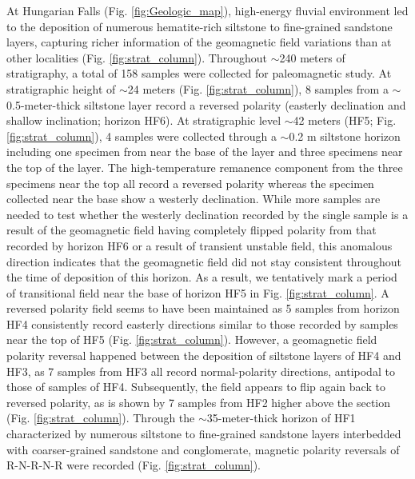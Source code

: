 \documentclass[draft]{agujournal2019}
\begin{document}
At Hungarian Falls (Fig. \ref{fig:Geologic_map}), high-energy fluvial environment led to the deposition of numerous hematite-rich siltstone to fine-grained sandstone layers, capturing richer information of the geomagnetic field variations than at other localities (Fig. \ref{fig:strat_column}). Throughout $\sim$240 meters of stratigraphy, a total of 158 samples were collected for paleomagnetic study. At stratigraphic height of $\sim$24 meters (Fig. \ref{fig:strat_column}), 8 samples from a $\sim$0.5-meter-thick siltstone layer record a reversed polarity (easterly declination and shallow inclination; horizon HF6). At stratigraphic level $\sim$42 meters (HF5; Fig. \ref{fig:strat_column}), 4 samples were collected through a $\sim$0.2 m siltstone horizon including one specimen from near the base of the layer and three specimens near the top of the layer. The high-temperature remanence component from the three specimens near the top all record a reversed polarity whereas the specimen collected near the base show a westerly declination. While more samples are needed to test whether the westerly declination recorded by the single sample is a result of the geomagnetic field having completely flipped polarity from that recorded by horizon HF6 or a result of transient unstable field, this anomalous direction indicates that the geomagnetic field did not stay consistent throughout the time of deposition of this horizon. As a result, we tentatively mark a period of transitional field near the base of horizon HF5 in Fig. \ref{fig:strat_column}. A reversed polarity field seems to have been maintained as 5 samples from horizon HF4 consistently record easterly directions similar to those recorded by samples near the top of HF5 (Fig. \ref{fig:strat_column}). However, a geomagnetic field polarity reversal happened between the deposition of siltstone layers of HF4 and HF3, as 7 samples from HF3 all record normal-polarity directions, antipodal to those of samples of HF4. Subsequently, the field appears to flip again back to reversed polarity, as is shown by 7 samples from HF2 higher above the section (Fig. \ref{fig:strat_column}). Through the $\sim$35-meter-thick horizon of HF1 characterized by numerous siltstone to fine-grained sandstone layers interbedded with coarser-grained sandstone and conglomerate, magnetic polarity reversals of R-N-R-N-R were recorded (Fig. \ref{fig:strat_column}). 
\end{document}
